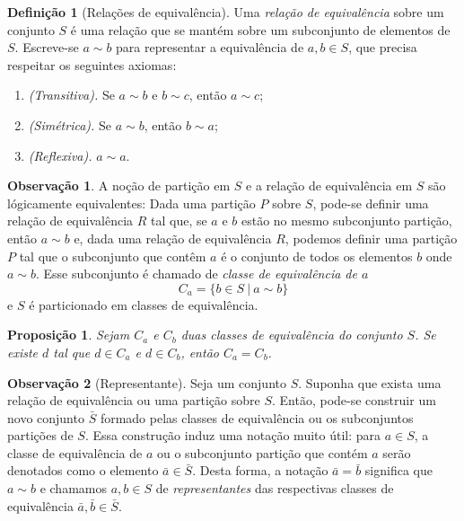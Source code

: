 \documentclass[a4paper,12pt]{report}
\theoremstyle{plain}
\newtheorem{proposicao}{Proposição}[section]
\theoremstyle{definition}
\newtheorem{definicao}{Definição}[section]
\newtheorem{observacao}{Observação}[section]
\begin{document}
\begin{definicao}[Relações de equivalência]
	Uma \emph{relação de equivalência} sobre um conjunto
	\(S\) é uma relação que se mantém sobre um subconjunto de elementos de
	\(S\). Escreve-se \(a\sim b\) para representar a equivalência de
	\(a, b \in S\), que precisa respeitar os seguintes axiomas:
	\begin{enumerate}
		\item \emph{(Transitiva).} Se \(a\sim b\) e \(b\sim c\), então \(a\sim c\);
		\item \emph{(Simétrica).} Se \(a\sim b\), então \(b\sim a\);
		\item \emph{(Reflexiva).} \(a\sim a\).
	\end{enumerate}
\end{definicao}

\begin{observacao}
	A noção de partição em \(S\) e a relação de equivalência em \(S\) são
	lógicamente equivalentes: Dada uma partição \(P\) sobre \(S\), pode-se
	definir uma relação de equivalência \(R\) tal que, se \(a\) e \(b\)
	estão no mesmo subconjunto partição, então \(a\sim b\) e, dada uma
	relação de equivalência \(R\), podemos definir uma partição \(P\) tal
	que o subconjunto que contêm \(a\) é o conjunto de todos os elementos
	\(b\) onde \(a\sim b\). Esse subconjunto é chamado de \emph{classe de
		equivalência de \(a\)}
	\[C_a = \{b\in S \ | \ a\sim b\}\]
	e \(S\) é particionado em classes de equivalência.
\end{observacao}

\begin{proposicao}
	Sejam \(C_a\) e \(C_b\) duas classes de equivalência do conjunto \(S\). Se existe \(d\) tal que \(d\in C_a\) e \(d\in C_b\), então \(C_a = C_b\).
\end{proposicao}

\begin{observacao}[Representante]
	Seja um conjunto \(S\). Suponha que exista uma relação de equivalência
	ou uma partição sobre \(S\). Então, pode-se construir um novo conjunto
	\(\bar{S}\) formado pelas classes de equivalência ou os subconjuntos
	partições de \(S\). Essa construção induz uma notação muito útil: para
	\(a\in S\), a classe de equivalência de \(a\) ou o subconjunto partição
	que contém \(a\) serão denotados como o elemento
	\(\bar{a} \in \bar{S}\). Desta forma, a notação \(\bar{a} = \bar{b}\)
	significa que \(a \sim b\) e chamamos \(a,b \in S\) de
	\emph{representantes} das respectivas classes de equivalência
	\(\bar{a}, \bar{b} \in \bar{S}\).
\end{observacao}
\end{document}
